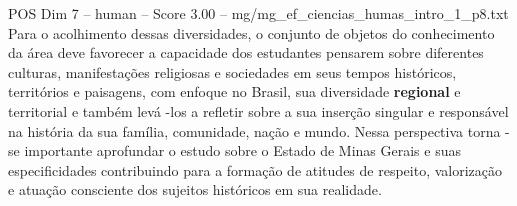 \begin{textsample}{POS Dim 7 – human – Score 3.00 – mg/mg\_ef\_ciencias\_humas\_intro\_1\_p8.txt}  \label{ex:f7_pos_017}
Para o acolhimento dessas diversidades, o conjunto de objetos do conhecimento da área deve favorecer a capacidade dos estudantes pensarem sobre diferentes culturas, manifestações religiosas e sociedades em seus tempos históricos, territórios e paisagens, com enfoque no Brasil, sua diversidade \textbf{regional} e territorial e também levá -los a refletir sobre a sua inserção singular e responsável na história da sua família, comunidade, nação e mundo.
Nessa perspectiva torna -se importante aprofundar o estudo sobre o Estado de Minas Gerais e suas especificidades contribuindo para a formação de atitudes de respeito, valorização e atuação consciente dos sujeitos históricos em sua realidade.

\end{textsample}
